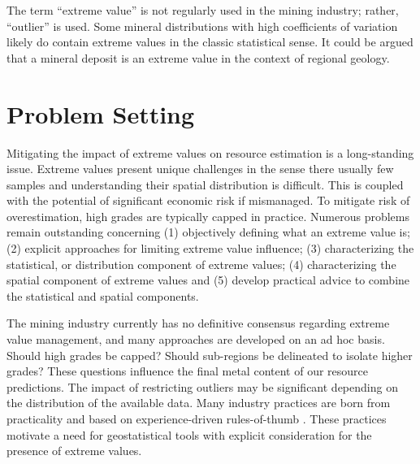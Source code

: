 The term ``extreme value'' is not regularly used in the mining industry; rather, ``outlier'' is used. Some mineral distributions with high coefficients of variation likely do contain extreme values in the classic statistical sense. It could be argued that a mineral deposit is an extreme value in the context of regional geology.




\FloatBarrier
\section{Problem Setting}
\label{sec:01problem}

Mitigating the impact of extreme values on resource estimation is a long-standing issue. Extreme values present unique challenges in the sense there usually few samples and understanding their spatial distribution is difficult. This is coupled with the potential of significant economic risk if mismanaged. To mitigate risk of overestimation, high grades are typically capped in practice. Numerous problems remain outstanding concerning (1) objectively defining what an extreme value is; (2) explicit approaches for limiting extreme value influence; (3) characterizing the statistical, or distribution component of extreme values; (4) characterizing the spatial component of extreme values and (5) develop practical advice to combine the statistical and spatial components.

The mining industry currently has no definitive consensus regarding extreme value management, and many approaches are developed on an ad hoc basis. Should high grades be capped? Should sub-regions be delineated to isolate higher grades? These questions influence the final metal content of our resource predictions. The impact of restricting outliers may be significant depending on the distribution of the available data. Many industry practices are born from practicality and based on experience-driven rules-of-thumb \citep{nowak2013suggestions}. These practices motivate a need for geostatistical tools with explicit consideration for the presence of extreme values.

